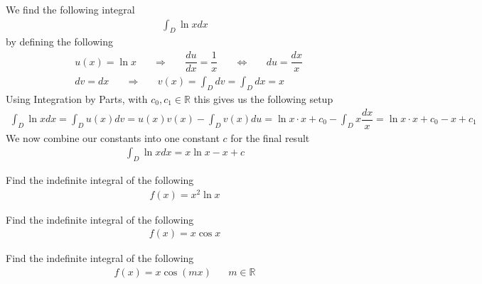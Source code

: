 \begin{example}
We find the following integral
\begin{align*}
    \int_{D} \ln x dx
\end{align*}
by defining the following
\begin{align*}
    &u(x) = \ln x \hspace{20pt} \Longrightarrow \hspace{20pt} \dfrac{du}{dx} = \dfrac{1}{x} \hspace{20pt} \Longleftrightarrow \hspace{20pt} du = \dfrac{dx}{x}\\[2ex]
    &dv = dx \hspace{20pt} \Longrightarrow \hspace{20pt} v(x) = \int_{D} dv = \int_{D} dx = x
\end{align*}
Using Integration by Parts, with $c_{0}, c_{1} \in \mathbb{R}$ this gives us the following setup
\begin{align*}
    \int_{D} \ln x dx = \int_{D} u(x) dv = u(x)v(x) - \int_{D} v(x) du = \ln x \cdot x + c_{0} - \int_{D} x \dfrac{dx}{x} = \ln x \cdot x + c_{0} - x + c_{1}
\end{align*}
We now combine our constants into one constant $c$ for the final result
\begin{align*}
    \int_{D} \ln x dx = x \ln x - x + c
\end{align*}
\end{example}

\begin{exercise}
Find the indefinite integral of the following
\begin{align*}
    f(x) = x^{2} \ln x
\end{align*}
\end{exercise}

\begin{exercise}
Find the indefinite integral of the following
\begin{align*}
    f(x) = x \cos x
\end{align*}
\end{exercise}

\begin{exercise}
Find the indefinite integral of the following
\begin{align*}
    f(x) = x \cos(mx) \hspace{20pt} m \in \mathbb{R}
\end{align*}
\end{exercise}

